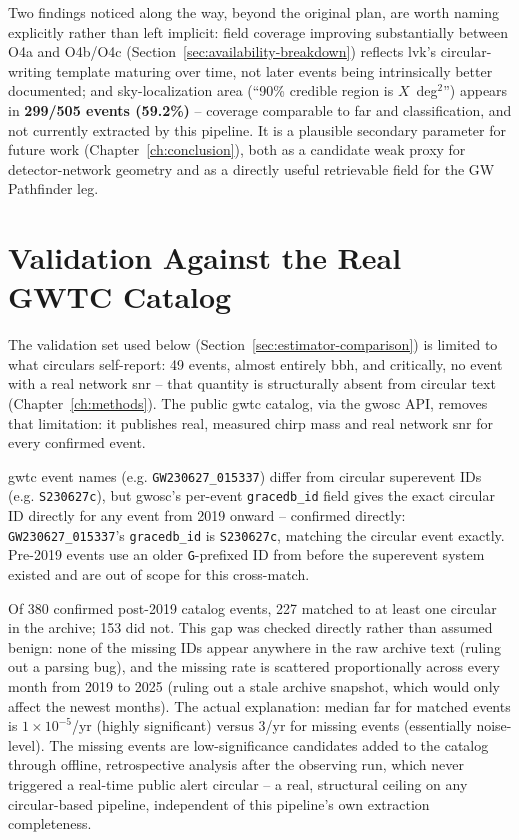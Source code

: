 Two findings noticed along the way, beyond the original plan, are worth naming explicitly rather than left implicit: field coverage improving substantially between O4a and O4b/O4c (Section~\ref{sec:availability-breakdown}) reflects \gls{lvk}'s circular-writing template maturing over time, not later events being intrinsically better documented; and sky-localization area (``90\% credible region is $X$~deg$^2$'') appears in \textbf{299/505 events (59.2\%)} -- coverage comparable to \gls{far} and classification, and not currently extracted by this pipeline. It is a plausible secondary parameter for future work (Chapter~\ref{ch:conclusion}), both as a candidate weak proxy for detector-network geometry and as a directly useful retrievable field for the GW Pathfinder leg.

\section{Validation Against the Real GWTC Catalog}
\label{sec:catalog-validation}

The validation set used below (Section~\ref{sec:estimator-comparison}) is limited to what circulars self-report: 49 events, almost entirely \gls{bbh}, and critically, no event with a real network \gls{snr} -- that quantity is structurally absent from circular text (Chapter~\ref{ch:methods}). The public \gls{gwtc} catalog, via the \gls{gwosc} API, removes that limitation: it publishes real, measured chirp mass and real network \gls{snr} for every confirmed event.

\gls{gwtc} event names (e.g. \texttt{GW230627\_015337}) differ from circular superevent IDs (e.g. \texttt{S230627c}), but \gls{gwosc}'s per-event \texttt{gracedb\_id} field gives the exact circular ID directly for any event from 2019 onward -- confirmed directly: \texttt{GW230627\_015337}'s \texttt{gracedb\_id} is \texttt{S230627c}, matching the circular event exactly. Pre-2019 events use an older \texttt{G}-prefixed ID from before the superevent system existed and are out of scope for this cross-match.

Of 380 confirmed post-2019 catalog events, 227 matched to at least one circular in the archive; 153 did not. This gap was checked directly rather than assumed benign: none of the missing IDs appear anywhere in the raw archive text (ruling out a parsing bug), and the missing rate is scattered proportionally across every month from 2019 to 2025 (ruling out a stale archive snapshot, which would only affect the newest months). The actual explanation: median \gls{far} for matched events is $1\times10^{-5}$/yr (highly significant) versus 3/yr for missing events (essentially noise-level). The missing events are low-significance candidates added to the catalog through offline, retrospective analysis after the observing run, which never triggered a real-time public alert circular -- a real, structural ceiling on any circular-based pipeline, independent of this pipeline's own extraction completeness.

